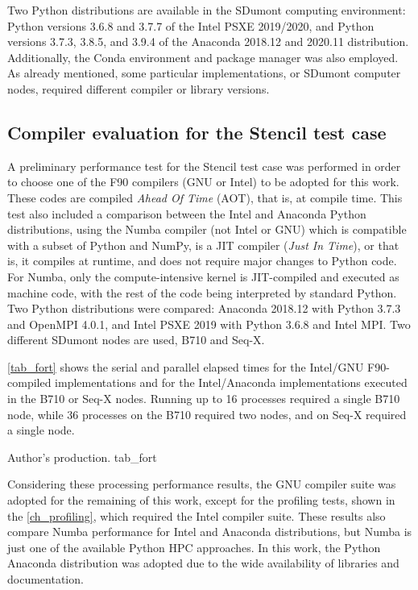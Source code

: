Two Python distributions are available in the SDumont computing environment: Python versions 3.6.8 and 3.7.7 of the Intel PSXE 2019/2020, and Python versions 3.7.3, 3.8.5, and 3.9.4 of the Anaconda 2018.12 and 2020.11 distribution. Additionally, the Conda environment and package manager was also employed. As already mentioned, some particular implementations, or SDumont computer nodes, required different compiler or library versions.

%
%
%
\subsection{Compiler evaluation for the Stencil test case}

A preliminary performance test for the Stencil test case was performed in order to choose one of the F90 compilers (GNU or Intel) to be adopted for this work. These codes are compiled \textit {Ahead Of Time} (AOT), that is, at compile time. This test also included a comparison between the Intel and Anaconda Python distributions, using the Numba compiler (not Intel or GNU) which is compatible with a subset of Python and NumPy, is a JIT compiler (\textit {Just In Time}), or that is, it compiles at runtime, and does not require major changes to Python code. For Numba, only the compute-intensive kernel is JIT-compiled and executed as machine code, with the rest of the code being interpreted by standard Python. Two Python distributions were compared: Anaconda 2018.12 with Python 3.7.3 and OpenMPI 4.0.1, and Intel PSXE 2019 with Python 3.6.8 and Intel MPI. Two different SDumont nodes are used, B710 and Seq-X.

\autoref {tab_fort} shows the serial and parallel elapsed times for the Intel/GNU F90-compiled implementations and for the Intel/Anaconda implementations executed in the B710 or Seq-X nodes. Running up to 16 processes required a single B710 node, while 36 processes on the B710 required two nodes, and on Seq-X required a single node.

     {Author's production.} {tab_fort}

Considering these processing performance results, the GNU compiler suite was adopted for the remaining of this work, except for the profiling tests, shown in the \autoref {ch_profiling}, which required the Intel compiler suite. These results also compare Numba performance for Intel and Anaconda distributions, but Numba is just one of the available Python HPC approaches. In this work, the Python Anaconda distribution was adopted due to the wide availability of libraries and documentation.

